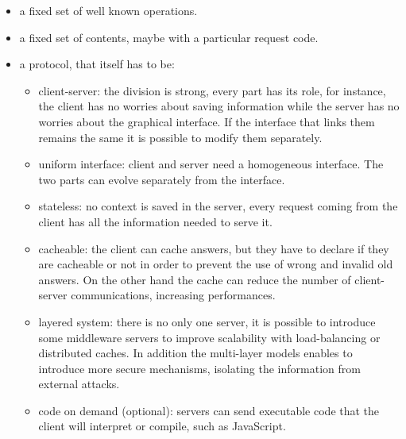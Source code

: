 \begin{itemize}
	\item a fixed set of well known operations.
	
	\item a fixed set of contents, maybe with a particular request code.
	
	\item a protocol, that itself has to be:
		\begin{itemize}
		
			\item client-server: the division is strong, every part has its role, for instance, the client has no worries about saving information while the server has no worries about the graphical interface. If the interface that links them remains the same it is possible to modify them separately.
			
			\item uniform interface: client and server need a homogeneous interface. The two parts can evolve separately from the interface.
			
			\item stateless: no context is saved in the server, every request coming from the client has all the information needed to serve it.
			
			\item cacheable: the client can cache answers, but they have to declare if they are cacheable or not in order to prevent the use of wrong and invalid old answers. On the other hand the cache can reduce the number of client-server communications, increasing performances. 
			
			\item layered system: there is no only one server, it is possible to introduce some middleware servers to improve scalability with load-balancing or distributed caches. In addition the multi-layer models enables to introduce more secure mechanisms, isolating the information from external attacks.
			
			\item code on demand (optional): servers can send executable code that the client will interpret or compile, such as JavaScript. 
			
		\end{itemize}
		
\end{itemize}

